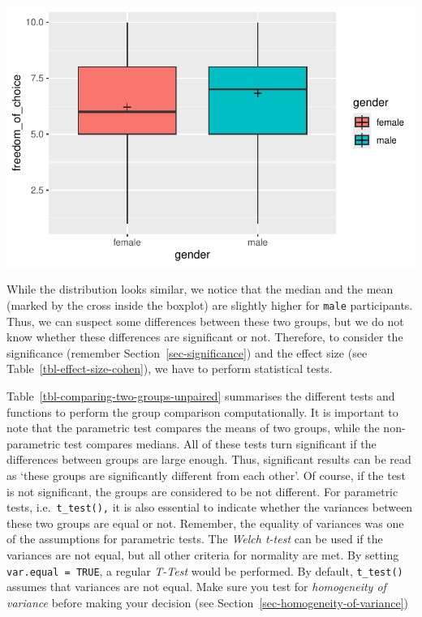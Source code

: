 \documentclass[
  letterpaper,
  DIV=11,
  numbers=noendperiod]{scrreprt}
\begin{document}
\includegraphics{11_group_comparison_files/figure-pdf/two-unpaired-groups-plot-1.pdf}

While the distribution looks similar, we notice that the median and the
mean (marked by the cross inside the boxplot) are slightly higher for
\texttt{male} participants. Thus, we can suspect some differences
between these two groups, but we do not know whether these differences
are significant or not. Therefore, to consider the significance
(remember Section~\ref{sec-significance}) and the effect size (see
Table~\ref{tbl-effect-size-cohen}), we have to perform statistical
tests.

Table~\ref{tbl-comparing-two-groups-unpaired} summarises the different
tests and functions to perform the group comparison computationally. It
is important to note that the parametric test compares the means of two
groups, while the non-parametric test compares medians. All of these
tests turn significant if the differences between groups are large
enough. Thus, significant results can be read as `these groups are
significantly different from each other'. Of course, if the test is not
significant, the groups are considered to be not different. For
parametric tests, i.e.~\texttt{t\_test(),} it is also essential to
indicate whether the variances between these two groups are equal or
not. Remember, the equality of variances was one of the assumptions for
parametric tests. The \emph{Welch t-test} can be used if the variances
are not equal, but all other criteria for normality are met. By setting
\texttt{var.equal\ =\ TRUE}, a regular \emph{T-Test} would be performed.
By default, \texttt{t\_test()} assumes that variances are not equal.
Make sure you test for \emph{homogeneity of variance} before making your
decision (see Section~\ref{sec-homogeneity-of-variance})
\end{document}
